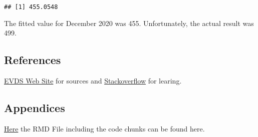 \documentclass[
]{article}
\begin{document}
\begin{verbatim}
## [1] 455.0548
\end{verbatim}

The fitted value for December 2020 was 455. Unfortunately, the actual
result was 499.

\hypertarget{references}{%
\subsection{References}\label{references}}

\href{https://evds2.tcmb.gov.tr/}{EVDS Web Site} for sources and
\href{https://stackoverflow.com/}{Stackoverflow} for learing.

\hypertarget{appendices}{%
\subsection{Appendices}\label{appendices}}

\href{https://bu-ie-360.github.io/fall20-kadirinip/files/HW3.Rmd}{Here}
the RMD File including the code chunks can be found here.
\end{document}
